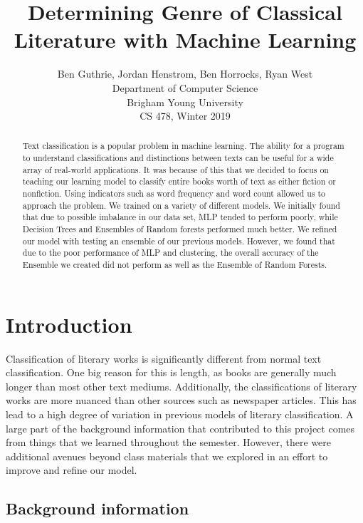 \documentclass{article}
\title{Determining Genre of Classical Literature with Machine Learning}
\author{Ben Guthrie, Jordan Henstrom, Ben Horrocks, Ryan West \\
Department of Computer Science\\
Brigham Young University \\
CS 478, Winter 2019}
\begin{document}
\maketitle

\begin{abstract}
Text classification is a popular problem in machine learning. The ability for a program to understand classifications and distinctions between texts can be useful for a wide array of real-world applications. It was because of this that we decided to focus on teaching our learning model to classify entire books worth of text as either fiction or nonfiction. Using indicators such as word frequency and word count allowed us to approach the problem. We trained on a variety of different models. We initially found that due to possible imbalance in our data set, MLP tended to perform poorly, while Decision Trees and Ensembles of Random forests performed much better. We refined our model with testing an ensemble of our previous models. However, we found that due to the poor performance of MLP and clustering, the overall accuracy of the Ensemble we created did not perform as well as the Ensemble of Random Forests.
\end{abstract}

\section{Introduction}

Classification of literary works is significantly different from normal text classification. One big reason for this is length, as books are generally much longer than most other text mediums. Additionally, the classifications of literary works are more nuanced than other sources such as newspaper articles. This has lead to a high degree of variation in previous models of literary classification. A large part of the background information that contributed to this project comes from things that we learned throughout the semester. However, there were additional avenues beyond class materials that we explored in an effort to improve and refine our model.

\subsection{Background information}
\end{document}
